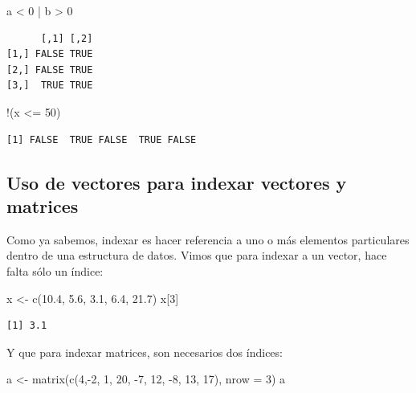 \documentclass[
]{book}
\newenvironment{Shaded}{\begin{snugshade}}{\end{snugshade}}
\newcommand{\AttributeTok}[1]{\textcolor[rgb]{0.77,0.63,0.00}{#1}}
\newcommand{\DecValTok}[1]{\textcolor[rgb]{0.00,0.00,0.81}{#1}}
\newcommand{\FloatTok}[1]{\textcolor[rgb]{0.00,0.00,0.81}{#1}}
\newcommand{\FunctionTok}[1]{\textcolor[rgb]{0.00,0.00,0.00}{#1}}
\newcommand{\NormalTok}[1]{#1}
\newcommand{\OtherTok}[1]{\textcolor[rgb]{0.56,0.35,0.01}{#1}}
\newcommand{\SpecialCharTok}[1]{\textcolor[rgb]{0.00,0.00,0.00}{#1}}
\begin{document}
\begin{Shaded}
\begin{Highlighting}[]
\NormalTok{a }\SpecialCharTok{\textless{}} \DecValTok{0} \SpecialCharTok{|}\NormalTok{ b }\SpecialCharTok{\textgreater{}} \DecValTok{0}
\end{Highlighting}
\end{Shaded}

\begin{verbatim}
      [,1] [,2]
[1,] FALSE TRUE
[2,] FALSE TRUE
[3,]  TRUE TRUE
\end{verbatim}

\begin{Shaded}
\begin{Highlighting}[]
\SpecialCharTok{!}\NormalTok{(x }\SpecialCharTok{\textless{}=} \DecValTok{50}\NormalTok{)}
\end{Highlighting}
\end{Shaded}

\begin{verbatim}
[1] FALSE  TRUE FALSE  TRUE FALSE
\end{verbatim}

\hypertarget{uso-de-vectores-para-indexar-vectores-y-matrices}{%
\subsection{Uso de vectores para indexar vectores y matrices}\label{uso-de-vectores-para-indexar-vectores-y-matrices}}

Como ya sabemos, indexar es hacer referencia a uno o más elementos particulares dentro de una estructura de datos. Vimos que para indexar a un vector, hace falta sólo un índice:

\begin{Shaded}
\begin{Highlighting}[]
\NormalTok{x }\OtherTok{\textless{}{-}} \FunctionTok{c}\NormalTok{(}\FloatTok{10.4}\NormalTok{, }\FloatTok{5.6}\NormalTok{, }\FloatTok{3.1}\NormalTok{, }\FloatTok{6.4}\NormalTok{, }\FloatTok{21.7}\NormalTok{)}
\NormalTok{x[}\DecValTok{3}\NormalTok{]}
\end{Highlighting}
\end{Shaded}

\begin{verbatim}
[1] 3.1
\end{verbatim}

Y que para indexar matrices, son necesarios dos índices:

\begin{Shaded}
\begin{Highlighting}[]
\NormalTok{a }\OtherTok{\textless{}{-}} \FunctionTok{matrix}\NormalTok{(}\FunctionTok{c}\NormalTok{(}\DecValTok{4}\NormalTok{,}\SpecialCharTok{{-}}\DecValTok{2}\NormalTok{, }\DecValTok{1}\NormalTok{, }\DecValTok{20}\NormalTok{, }\SpecialCharTok{{-}}\DecValTok{7}\NormalTok{, }\DecValTok{12}\NormalTok{, }\SpecialCharTok{{-}}\DecValTok{8}\NormalTok{, }\DecValTok{13}\NormalTok{, }\DecValTok{17}\NormalTok{), }\AttributeTok{nrow =} \DecValTok{3}\NormalTok{)}
\NormalTok{a}
\end{Highlighting}
\end{Shaded}
\end{document}
